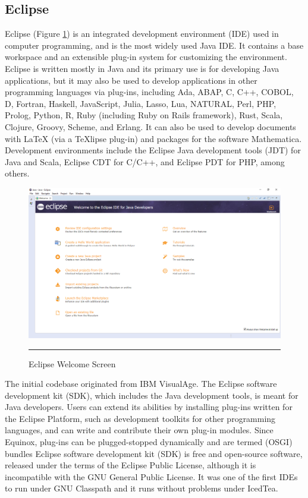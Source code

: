 \subsection{Eclipse}
Eclipse (Figure \ref{fig:eclipse}) is an integrated development environment (IDE) used in computer programming, and is the most widely used Java IDE. It contains a base workspace and an extensible plug-in system for customizing the environment. Eclipse is written mostly in Java and its primary use is for developing Java applications, but it may also be used to develop applications in other programming languages via plug-ins, including Ada, ABAP, C, C++, COBOL, D, Fortran, Haskell, JavaScript, Julia, Lasso, Lua, NATURAL, Perl, PHP, Prolog, Python, R, Ruby (including Ruby on Rails framework), Rust, Scala, Clojure, Groovy, Scheme, and Erlang. It can also be used to develop documents with LaTeX (via a TeXlipse plug-in) and packages for the software Mathematica. Development environments include the Eclipse Java development tools (JDT) for Java and Scala, Eclipse CDT for C/C++, and Eclipse PDT for PHP, among others.
\newline
\begin{figure}[h!]
	\centering
	\includegraphics[width=1\textwidth]{./images/eclipse}
	\rule{1\textwidth}{1pt}
	\caption{Eclipse Welcome Screen}
	\label{fig:eclipse}
\end{figure}
The initial codebase originated from IBM VisualAge. The Eclipse software development kit (SDK), which includes the Java development tools, is meant for Java developers. Users can extend its abilities by installing plug-ins written for the Eclipse Platform, such as development toolkits for other programming languages, and can write and contribute their own plug-in modules. Since Equinox, plug-ins can be plugged-stopped dynamically and are termed (OSGI) bundles Eclipse software development kit (SDK) is free and open-source software, released under the terms of the Eclipse Public License, although it is incompatible with the GNU General Public License. It was one of the first IDEs to run under GNU Classpath and it runs without problems under IcedTea.

